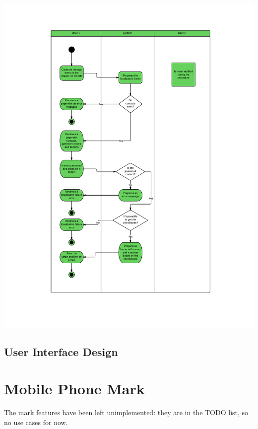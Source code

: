 \includegraphics[scale=0.7]{images/Localization}

\newpage
\subsection{User Interface Design}

\section{Mobile Phone Mark}
The mark features have been left unimplemented: they are in the TODO list,
so no use cases for now.


\newpage


